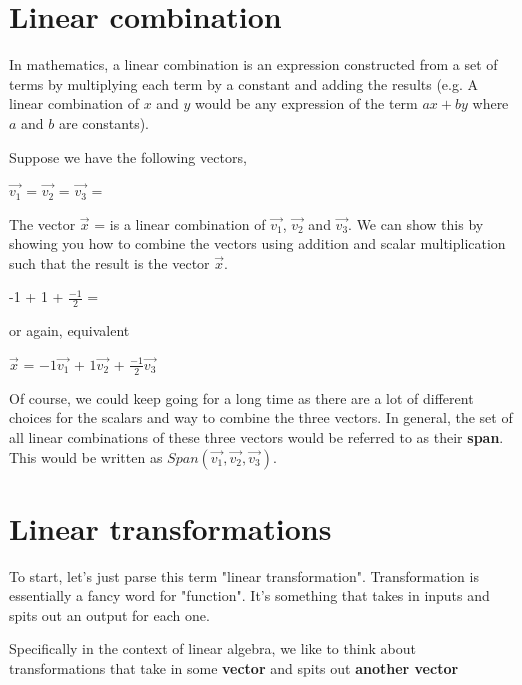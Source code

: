\documentclass[12pt]{article}
\begin{document}
\section{Linear combination}

In mathematics, a linear combination is an expression constructed from a set of terms by multiplying each term by a constant and adding the results (e.g. A linear combination of $x$ and $y$ would be any expression of the term $ax + by$ where $a$ and $b$ are constants).

Suppose we have the following vectors,

$\vec{v_1}$ =  $\vec{v_2}$ =  $\vec{v_3}$ = 

The vector $\vec{x}$ =  is a linear combination of $\vec{v_1}$, $\vec{v_2}$ and $\vec{v_3}$. We can show this by showing you how to combine the vectors using addition and scalar multiplication such that the result is the vector $\vec{x}$.

-1 + 1 + $\frac{-1}{2}$ = 

or again, equivalent

$\vec{x}$ = $-1\vec{v_1}$ + $1\vec{v_2}$ + $\frac{-1}{2}\vec{v_3}$

Of course, we could keep going for a long time as there are a lot of different choices for the scalars and way to combine the three vectors. In general, the set of all linear combinations of these three vectors would be referred to as their \textbf{span}. This would be written as $Span(\vec{v_1}, \vec{v_2}, \vec{v_3})$.

\section{Linear transformations}

To start, let's just parse this term "linear transformation". Transformation is essentially a fancy word for "function". It's something that takes in inputs and spits out an output for each one.


Specifically in the context of linear algebra, we like to think about transformations that take in some \textbf{vector} and spits out \textbf{another vector}

\end{document}
